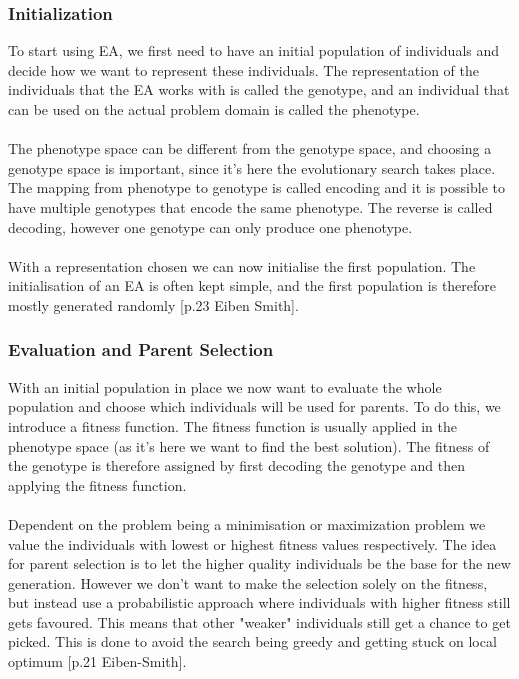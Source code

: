 \documentclass[11pt, a4paper]{article}
\begin{document}
\subsubsection{Initialization}
To start using EA, we first need to have an initial population of individuals and decide how we want to represent these individuals. The representation of the individuals that the EA works with is called the genotype, and an individual that can be used on the actual problem domain is called the phenotype.
\\
\\
The phenotype space can be different from the genotype space, and choosing a genotype space is important, since it's here the evolutionary search takes place. The mapping from phenotype to genotype is called encoding and it is possible to have multiple genotypes that encode the same phenotype. The reverse is called decoding, however one genotype can only produce one phenotype.
\\
\\
With a representation chosen we can now initialise the first population. The initialisation of an EA is often kept simple, and the first population is therefore mostly generated randomly [p.23 Eiben Smith].
\subsubsection{Evaluation and Parent Selection}
With an initial population in place we now want to evaluate the whole population and choose which individuals will be used for parents. To do this, we introduce a fitness function. The fitness function is usually applied in the phenotype space (as it's here we want to find the best solution). The fitness of the genotype is therefore assigned by first decoding the genotype and then applying the fitness function.
\\
\\
Dependent on the problem being a minimisation or maximization problem we value the individuals with lowest or highest fitness values respectively. The idea for parent selection is to let the higher quality individuals be the base for the new generation. However we don't want to make the selection solely on the fitness, but instead use a probabilistic approach where individuals with higher fitness still gets favoured. This means that other  "weaker" individuals still get a chance to get picked. This is done to avoid the search being greedy and getting stuck on local optimum [p.21 Eiben-Smith].
\end{document}
